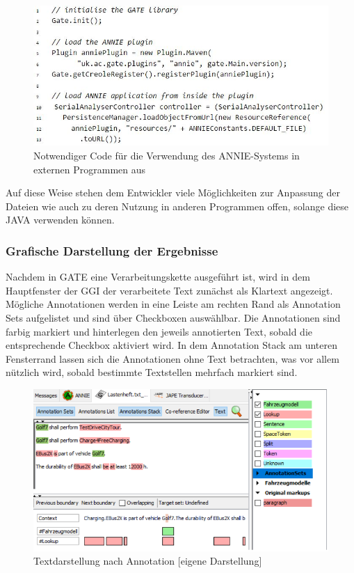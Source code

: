 \documentclass[12pt]{report}
\begin{document}
\begin{figure}[h!]
\begin{center}
\includegraphics[scale=0.8]{GATE_Bilder/Einbettung.jpg}
\caption{Notwendiger Code für die Verwendung des ANNIE-Systems in externen Programmen aus \cite{gt18}}
\end{center}
\end{figure}

Auf diese Weise stehen dem Entwickler viele Möglichkeiten zur Anpassung der Dateien wie auch zu deren Nutzung in anderen Programmen offen, solange diese JAVA verwenden können.\\

\subsubsection{Grafische Darstellung der Ergebnisse}
Nachdem in GATE eine Verarbeitungskette ausgeführt ist, wird in dem Hauptfenster der GGI der verarbeitete Text zunächst als Klartext angezeigt. Mögliche Annotationen werden in eine Leiste am rechten Rand als \glqq  Annotation Sets\grqq{} aufgelistet und sind über Checkboxen auswählbar. Die Annotationen sind farbig markiert und hinterlegen den jeweils annotierten Text, sobald die entsprechende Checkbox aktiviert wird.
In dem Annotation Stack am unteren Fensterrand lassen sich die Annotationen ohne Text betrachten, was vor allem nützlich wird, sobald bestimmte Textstellen mehrfach markiert sind.\\

\begin{figure}
\begin{center}
\includegraphics[scale=0.8]{GATE_Bilder/GATE-MarkUp.png}
\caption{Textdarstellung nach Annotation [eigene Darstellung]}
\end{center}
\end{figure}
\end{document}

